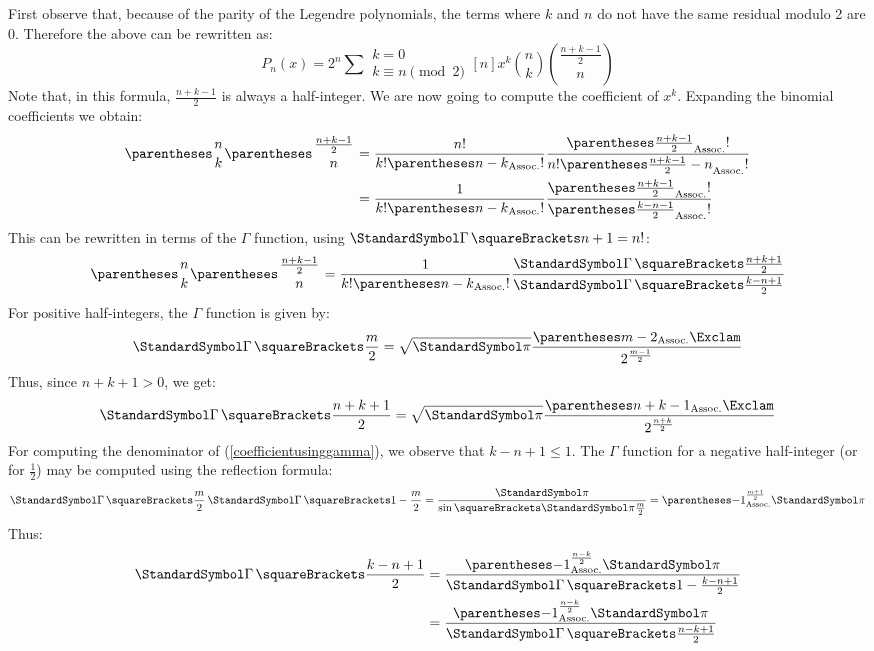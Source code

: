 \documentclass[10pt, a4paper, twoside]{basestyle}
\begin{document}
First observe that, because of the parity of the Legendre polynomials, the terms where $k$ and $n$ do not have the same residual modulo 2 are 0.  Therefore the above can be rewritten as:
\begin{equation*}
P_n(x) = 2^n \sum{\substack{k = 0\\ k \equiv n \pmod 2}}[n] x^k \binom{n}{k} \binom{\frac{n + k - 1}{2}}{n}
\end{equation*}
Note that, in this formula, $\frac{n + k - 1}{2}$ is always a half-integer.  We are now going to compute the coefficient of $x^k$.  Expanding the binomial coefficients we obtain:
\begin{align*}
\binom{n}{k} \binom{\frac{n + k - 1}{2}}{n} &=
  \frac{\Factorial{n}}
       {\Factorial{k}\Factorial{\pa{n - k}}}
  \frac{\Factorial{\pa{\frac{n + k - 1}{2}}}}
       {\Factorial{n}\Factorial{\pa{\frac{n + k - 1}{2} - n}}}\\
&=
  \frac{1}
       {\Factorial{k}\Factorial{\pa{n - k}}}
  \frac{\Factorial{\pa{\frac{n + k - 1}{2}}}}
       {\Factorial{\pa{\frac{k - n - 1}{2}}}}
\end{align*}
This can be rewritten in terms of the $\Gamma$ function, using $\Gamma\of{n + 1} = \Factorial{n}$:
\begin{equation}
\label{coefficientusinggamma}
\binom{n}{k} \binom{\frac{n + k - 1}{2}}{n} =
  \frac{1}
       {\Factorial{k}\Factorial{\pa{n - k}}}
  \frac{\Gamma\of{\frac{n + k + 1}{2}}}
       {\Gamma\of{\frac{k - n + 1}{2}}}
\end{equation}
For positive half-integers, the $\Gamma$ function is given by:
\begin{equation}
\label{gammahalfinteger}
\Gamma\of{\frac{m}{2}} =
  \sqrt{\Pi}
  \frac{\DoubleFactorial{\pa{m - 2}}}{2^{\frac{m - 1}{2}}}
\end{equation}
Thus, since $n + k + 1 > 0$, we get:
\begin{equation*}
\Gamma\of{\frac{n + k + 1}{2}} =
  \sqrt{\Pi}
  \frac{\DoubleFactorial{\pa{n + k - 1}}}{2^{\frac{n + k}{2}}}
\end{equation*}
For computing the denominator of (\ref{coefficientusinggamma}), we observe that $k - n + 1 \leq 1$.  The $\Gamma$ function for a negative half-integer (or for $\frac{1}{2}$) may be computed using the reflection formula:
\begin{equation*}
\Gamma\of{\frac{m}{2}}\Gamma\of{1 - \frac{m}{2}} = \frac{\Pi}{\sin\of{\Pi\frac{m}{2}}} = \pa{-1}^{\frac{m + 1}{2}} \Pi
\end{equation*}
Thus:
\begin{align*}
\Gamma\of{\frac{k - n + 1}{2}} &= \frac{\pa{-1}^{\frac{n - k}{2}} \Pi}{\Gamma\of{1 - \frac{k - n + 1}{2}}}\\
&= \frac{\pa{-1}^{\frac{n - k}{2}} \Pi}{\Gamma\of{\frac{n - k + 1}{2}}}
\end{align*}
\end{document}

